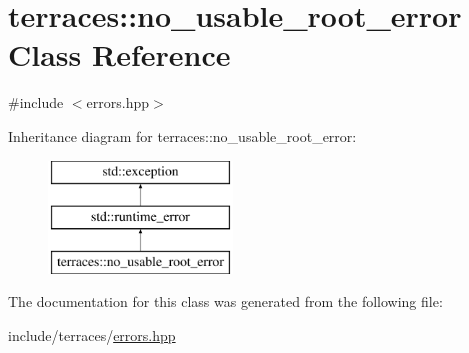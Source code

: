 \hypertarget{classterraces_1_1no__usable__root__error}{}\section{terraces\+:\+:no\+\_\+usable\+\_\+root\+\_\+error Class Reference}
\label{classterraces_1_1no__usable__root__error}


{\ttfamily \#include $<$errors.\+hpp$>$}

Inheritance diagram for terraces\+:\+:no\+\_\+usable\+\_\+root\+\_\+error\+:\begin{figure}[H]
\begin{center}
\leavevmode
\includegraphics[height=3.000000cm]{classterraces_1_1no__usable__root__error}
\end{center}
\end{figure}


The documentation for this class was generated from the following file\+:\begin{DoxyCompactItemize}
\item 
include/terraces/\hyperlink{errors_8hpp}{errors.\+hpp}\end{DoxyCompactItemize}
